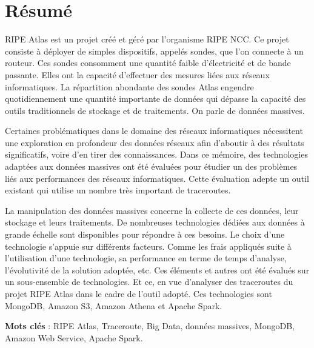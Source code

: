 \chapter*{Résumé}


RIPE Atlas est un projet créé et géré par l'organisme RIPE NCC.  Ce projet consiste  à déployer de
simples dispositifs, appelés sondes, que l'on  connecte à un routeur. Ces sondes consomment une quantité
faible d'électricité et de bande passante. Elles ont la capacité d'effectuer des mesures liées aux réseaux informatiques.
La répartition abondante des sondes Atlas engendre quotidiennement une quantité importante
de données qui dépasse la capacité des outils traditionnels de stockage et de traitements. On parle de données massives. 

Certaines problématiques dans le domaine des réseaux
informatiques nécessitent une exploration en profondeur des données réseaux afin d'aboutir à des
résultats significatifs, voire d'en tirer des connaissances. Dans ce mémoire, des technologies adaptées aux données massives ont été évaluées pour étudier un des problèmes liés aux performances des réseaux informatiques. Cette  évaluation adepte un outil existant qui utilise    un nombre très important de traceroutes. 




La manipulation des données massives concerne la collecte de ces données, leur stockage et leurs traitements. De nombreuses  technologies dédiées aux données à grande échelle  sont disponibles pour répondre à ces besoins. Le choix d'une technologie s'appuie sur différents facteurs. Comme les frais appliqués suite à l'utilisation d'une technologie, sa performance en terme de temps d'analyse, l'évolutivité de la solution adoptée, etc. Ces  éléments  et autres ont été évalués sur un sous-ensemble de technologies. Et ce, en vue d'analyser des traceroutes du projet RIPE Atlas dans le cadre de l'outil adopté. Ces technologies sont MongoDB, Amazon S3, Amazon Athena et Apache Spark.








\textbf{Mots clés} : RIPE Atlas, Traceroute,  Big Data, données massives, MongoDB, Amazon Web Service, Apache Spark.